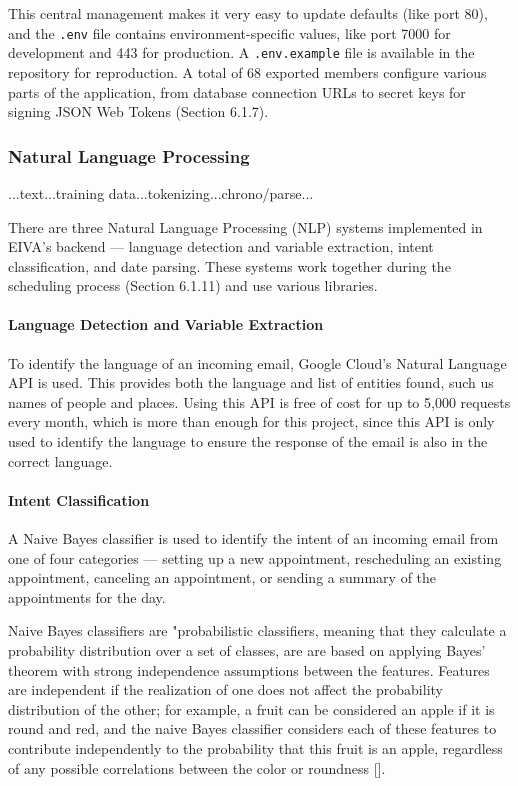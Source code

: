 \documentclass{article}
\begin{document}
This central management makes it very easy to update defaults (like port 80), and the \texttt{.env} file contains environment-specific values, like port 7000 for development and 443 for production. A \texttt{.env.example} file is available in the repository for reproduction. A total of 68 exported members configure various parts of the application, from database connection URLs to secret keys for signing JSON Web Tokens (Section 6.1.7).

\subsubsection{Natural Language Processing}

...text...training data...tokenizing...chrono/parse...

There are three Natural Language Processing (NLP) systems implemented in EIVA's backend --- language detection and variable extraction, intent classification, and date parsing. These systems work together during the scheduling process (Section 6.1.11) and use various libraries.

\paragraph{Language Detection and Variable Extraction}

To identify the language of an incoming email, Google Cloud's Natural Language API is used. This provides both the language and list of entities found, such us names of people and places. Using this API is free of cost for up to 5,000 requests every month, which is more than enough for this project, since this API is only used to identify the language to ensure the response of the email is also in the correct language.

\paragraph{Intent Classification}

A Naive Bayes classifier is used to identify the intent of an incoming email from one of four categories --- setting up a new appointment, rescheduling an existing appointment, canceling an appointment, or sending a summary of the appointments for the day.

Naive Bayes classifiers are "probabilistic classifiers, meaning that they calculate a probability distribution over a set of classes, are are based on applying Bayes' theorem with strong independence assumptions between the features. Features are independent if the realization of one does not affect the probability distribution of the other; for example, a fruit can be considered an apple if it is round and red, and the naive Bayes classifier considers each of these features to contribute independently to the probability that this fruit is an apple, regardless of any possible correlations between the color or roundness [].
\end{document}
